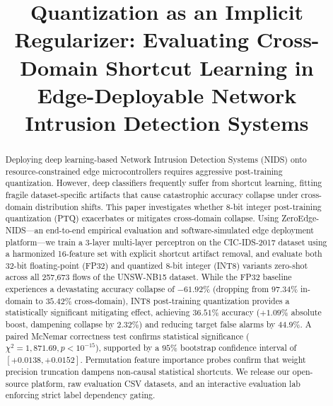 \documentclass[conference]{IEEEtran}
\begin{document}
\title{Quantization as an Implicit Regularizer: Evaluating Cross-Domain Shortcut Learning in Edge-Deployable Network Intrusion Detection Systems}

\author{
\and
{}
\and
{}
}

\maketitle

\begin{abstract}
Deploying deep learning-based Network Intrusion Detection Systems (NIDS) onto resource-constrained edge microcontrollers requires aggressive post-training quantization. However, deep classifiers frequently suffer from shortcut learning, fitting fragile dataset-specific artifacts that cause catastrophic accuracy collapse under cross-domain distribution shifts. This paper investigates whether 8-bit integer post-training quantization (PTQ) exacerbates or mitigates cross-domain collapse. Using ZeroEdge-NIDS—an end-to-end empirical evaluation and software-simulated edge deployment platform—we train a 3-layer multi-layer perceptron on the CIC-IDS-2017 dataset using a harmonized 16-feature set with explicit shortcut artifact removal, and evaluate both 32-bit floating-point (FP32) and quantized 8-bit integer (INT8) variants zero-shot across all 257,673 flows of the UNSW-NB15 dataset. While the FP32 baseline experiences a devastating accuracy collapse of $-61.92\%$ (dropping from $97.34\%$ in-domain to $35.42\%$ cross-domain), INT8 post-training quantization provides a statistically significant mitigating effect, achieving $36.51\%$ accuracy ($+1.09\%$ absolute boost, dampening collapse by $2.32\%$) and reducing target false alarms by $44.9\%$. A paired McNemar correctness test confirms statistical significance ($\chi^2 = 1,871.69, p < 10^{-15}$), supported by a $95\%$ bootstrap confidence interval of $[+0.0138, +0.0152]$. Permutation feature importance probes confirm that weight precision truncation dampens non-causal statistical shortcuts. We release our open-source platform, raw evaluation CSV datasets, and an interactive evaluation lab enforcing strict label dependency gating.
\end{abstract}
\end{document}
